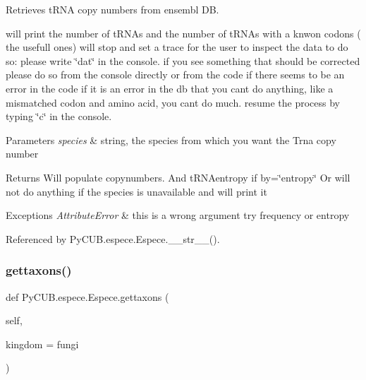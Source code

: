 Retrieves t\+R\+NA copy numbers from ensembl DB. 

will print the number of t\+R\+N\+As and the number of t\+R\+N\+As with a knwon codons ( the usefull ones) will stop and set a trace for the user to inspect the data to do so\+: please write \char`\"{}dat\char`\"{} in the console. if you see something that should be corrected please do so from the console directly or from the code if there seems to be an error in the code if it is an error in the db that you can\textquotesingle{}t do anything, like a mismatched codon and amino acid, you can\textquotesingle{}t do much. resume the process by typing \char`\"{}c\char`\"{} in the console.


\begin{DoxyParams}{Parameters}
{\em species} & string, the species from which you want the Trna copy number\\
\hline
\end{DoxyParams}
\begin{DoxyReturn}{Returns}
Will populate copynumbers. And t\+R\+N\+Aentropy if by=\char`\"{}entropy\char`\"{} Or will not do anything if the species is unavailable and will print it
\end{DoxyReturn}

\begin{DoxyExceptions}{Exceptions}
{\em Attribute\+Error} & this is a wrong argument try frequency or entropy \\
\hline
\end{DoxyExceptions}


Referenced by Py\+C\+U\+B.\+espece.\+Espece.\+\_\+\+\_\+str\+\_\+\+\_\+().

\mbox{\label{class_py_c_u_b_1_1espece_1_1_espece_af716fcd7e7e34e12cd7786469d695422}} 
\subsubsection{\texorpdfstring{gettaxons()}{gettaxons()}}
{\footnotesize\ttfamily def Py\+C\+U\+B.\+espece.\+Espece.\+gettaxons (\begin{DoxyParamCaption}\item[{}]{self,  }\item[{}]{kingdom = {\ttfamily \textquotesingle{}fungi\textquotesingle{}} }\end{DoxyParamCaption})}



